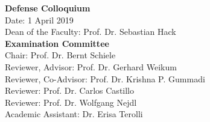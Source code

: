 \newpage
\noindent
\textbf{Defense Colloquium} \\[0.25cm]
Date: \hspace{3.2cm}1 April 2019\\[1cm]
Dean of the Faculty: \hspace{0.88cm}Prof. Dr. Sebastian Hack \\[2.5cm]
%
\textbf{Examination Committee} \\[0.25cm]
Chair: \hspace{3.1cm}Prof. Dr. Bernt Schiele\\[1.0cm]%
%
Reviewer, Advisor: \hspace{1.05cm} Prof. Dr. Gerhard Weikum\\[1.0cm]
%
Reviewer, Co-Advisor: \hspace{0.55cm} Prof. Dr. Krishna P. Gummadi\\[1.0cm]
%
Reviewer: \hspace{2.50cm} Prof. Dr. Carlos Castillo\\[1.0cm]
%
Reviewer: \hspace{2.50cm} Prof. Dr. Wolfgang Nejdl\\[1.0cm]
%
Academic Assistant: \hspace{0.92cm} Dr. Erisa Terolli\\[1.0cm]%

\cleardoublepage



\cleardoublepage



